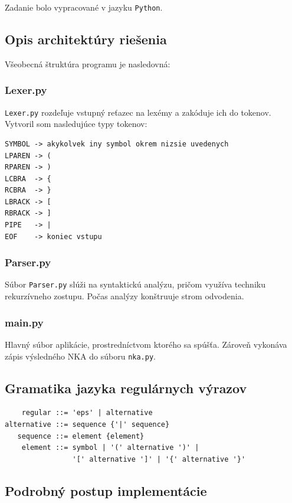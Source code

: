 \documentclass[a4paper,12pt]{article}
\begin{document}
Zadanie bolo vypracované v jazyku \texttt{Python}.

\subsection{Opis architektúry riešenia}\label{subsec:architecture}
Všeobecná štruktúra programu je nasledovná:
\subsubsection{Lexer.py}
\texttt{Lexer.py} rozdeľuje vstupný reťazec na lexémy a zakóduje ich do tokenov.
Vytvoril som nasledujúce typy tokenov:
\lstset{basicstyle=\ttfamily}
\begin{lstlisting}
SYMBOL -> akykolvek iny symbol okrem nizsie uvedenych
LPAREN -> (
RPAREN -> )
LCBRA  -> {
RCBRA  -> }
LBRACK -> [
RBRACK -> ]
PIPE   -> |
EOF    -> koniec vstupu
\end{lstlisting}

\subsubsection{Parser.py}
Súbor \texttt{Parser.py} slúži na syntaktickú analýzu, pričom využíva techniku rekurzívneho zostupu.
Počas analýzy konštruuje strom odvodenia.

\subsubsection{main.py}
Hlavný súbor aplikácie, prostredníctvom ktorého sa spúšťa.
Zároveň vykonáva zápis výsledného NKA do súboru \texttt{nka.py}.

\subsection{Gramatika jazyka regulárnych výrazov} \label{subsec:gramatic}

\lstset{basicstyle=\ttfamily}
\begin{lstlisting}
    regular ::= 'eps' | alternative
alternative ::= sequence {'|' sequence}
   sequence ::= element {element}
    element ::= symbol | '(' alternative ')' |
                '[' alternative ']' | '{' alternative '}'

\end{lstlisting}

\subsection{Podrobný postup implementácie}
\end{document}
